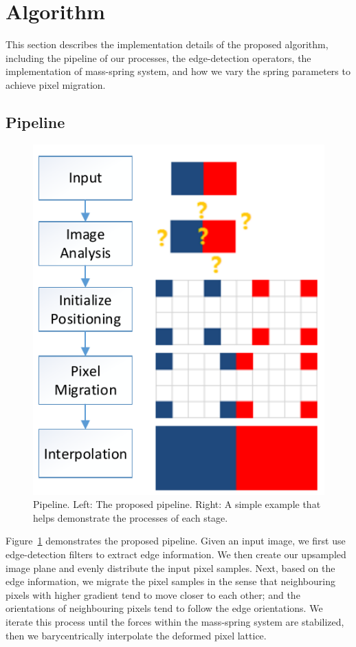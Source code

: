 \section{Algorithm}\label{PM:algo}
This section describes the implementation details of the proposed algorithm, including the pipeline of our processes, the edge-detection operators, the implementation of mass-spring system, and how we vary the spring parameters to achieve pixel migration.
\subsection{Pipeline}

\begin{figure}[htbp]\centering
\includegraphics{imagesPM/migrationPipeline.pdf}
\caption{Pipeline. Left: The proposed pipeline. Right: A simple example that helps demonstrate the processes of each stage.}
\label{fig:PMpipeline}
\end{figure}

Figure~\ref{fig:PMpipeline} demonstrates the proposed pipeline. Given an input image, we first use edge-detection filters to extract edge information. We then create our upsampled image plane and evenly distribute the input pixel samples. Next, based on the edge information, we migrate the pixel samples in the sense that neighbouring pixels with higher gradient tend to move closer to each other; and the orientations of neighbouring pixels tend to follow the edge orientations. We iterate this process until the forces within the mass-spring system are stabilized, then we barycentrically interpolate the deformed pixel lattice. 

